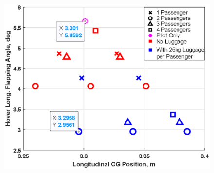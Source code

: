 \documentclass[11pt,a4paper]{article}
\begin{document}
\begin{appendices}
\begin{figure}[H]
\begin{minipage}{.49\textwidth}
  \label{fig:CGCRUISEF}
\end{minipage}\hspace{0.2cm}
\begin{minipage}{.49\textwidth}
  \centering
  \includegraphics[width=\linewidth]{CGHOVERF.eps}
  \label{fig:CGHOVERF}
\end{minipage}
\end{figure}
\end{appendices}{}
\thispagestyle{empty}
\end{document}
